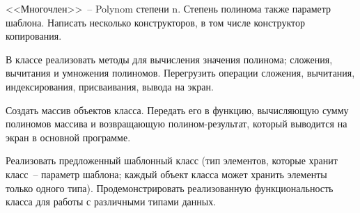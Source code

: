 
<<Многочлен>>~-- Polynom степени n. Степень полинома также параметр шаблона.
Написать несколько конструкторов, в том числе конструктор копирования.

В классе
реализовать методы для вычисления значения полинома; сложения, вычитания и
умножения полиномов. Перегрузить операции сложения, вычитания, индексирования,
присваивания, вывода на экран.

Создать массив объектов класса. Передать его в функцию,
вычисляющую сумму полиномов массива и возвращающую полином-результат, который
выводится на экран в основной программе.

Реализовать предложенный шаблонный класс (тип элементов, которые
хранит класс~-- параметр шаблона; каждый объект класса может хранить
элементы только одного типа). Продемонстрировать реализованную
функциональность класса для работы с различными типами данных.
